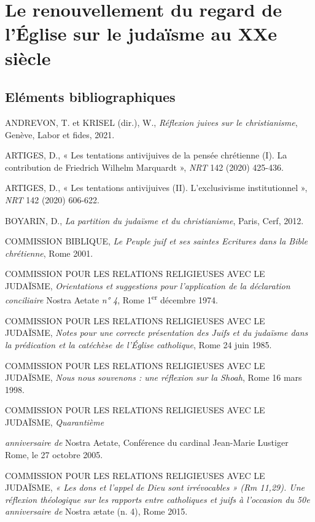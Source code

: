 
\chapter{Le renouvellement du regard de l'Église sur le judaïsme au XXe siècle}


\hypertarget{eluxe9ments-bibliographiques}{%
\section{Eléments bibliographiques}\label{eluxe9ments-bibliographiques}}


ANDREVON, T. et KRISEL (dir.), W., \emph{Réflexion juives sur le
christianisme}, Genève, Labor et fides, 2021.

ARTIGES, D., « Les tentations antivijuives de la pensée chrétienne (I).
La contribution de Friedrich Wilhelm Marquardt », \emph{NRT} 142 (2020)
425-436.

ARTIGES, D., « Les tentations antivijuives (II). L'exclusivisme
institutionnel », \emph{NRT} 142 (2020) 606-622.

BOYARIN, D., \emph{La partition du judaïsme et du christianisme}, Paris,
Cerf, 2012.

COMMISSION BIBLIQUE, \emph{Le Peuple juif et ses saintes Ecritures dans
la Bible chrétienne}, Rome 2001.

COMMISSION POUR LES RELATIONS RELIGIEUSES AVEC LE JUDAÏSME,
\emph{Orientations et}
\emph{suggestions pour l'application de la déclaration conciliaire}
Nostra Aetate \emph{n° 4}, Rome 1\textsuperscript{er} décembre 1974.

COMMISSION POUR LES RELATIONS RELIGIEUSES AVEC LE JUDAÏSME, \emph{Notes
pour une}
\emph{correcte présentation des Juifs et du judaïsme dans la prédication
et la catéchèse de l'Église catholique}, Rome 24 juin 1985.

COMMISSION POUR LES RELATIONS RELIGIEUSES AVEC LE JUDAÏSME, \emph{Nous
nous}
\emph{souvenons : une réflexion sur la Shoah}, Rome 16 mars 1998.

COMMISSION POUR LES RELATIONS RELIGIEUSES AVEC LE JUDAÏSME,
\emph{Quarantième}

\emph{anniversaire de} Nostra Aetate, Conférence du cardinal Jean-Marie
Lustiger Rome, le 27 octobre 2005.

COMMISSION POUR LES RELATIONS RELIGIEUSES AVEC LE JUDAÏSME, \emph{« Les
dons et l'appel}
\emph{de Dieu sont irrévocables » (Rm 11,29). Une réflexion théologique
sur les rapports entre catholiques et juifs à l'occasion du 50e
anniversaire de} Nostra ætate (n. 4), Rome 2015.

